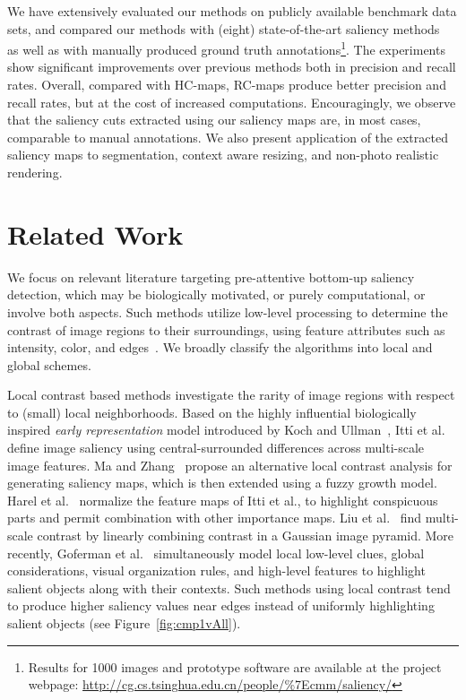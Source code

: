 \documentclass[10pt,twocolumn,letterpaper]{article}
\newcommand{\figref}[1]{Figure~\ref{#1}}
\newcommand{\RC}{RC-maps }
\begin{document}
We have extensively evaluated our methods on publicly available benchmark data sets, and compared
our methods with (eight) state-of-the-art saliency methods
~\cite{98pami/Itti,03ACMMM/Ma_Contrast-based,06acmmm/ZhaiS_spatiotemporal,conf/nips/HarelKP06,07cvpr/hou_SpectralResidual,08cvs/achanta_salient,09cvpr/Achanta_FTSaliency,10cvpr/goferman_context}
as well as with manually produced ground truth annotations\footnote{Results for 1000 images and
prototype software are available at the project webpage:
\href{http://cg.cs.tsinghua.edu.cn/people/~cmm/saliency/}{http://cg.cs.tsinghua.edu.cn/people/\%7Ecmm/saliency/}}.
%
The experiments show significant improvements over previous methods both in precision and recall rates.
%
Overall, compared with HC-maps, \RC produce better precision and recall rates, but at the cost
of increased computations. Encouragingly, we observe that the saliency cuts extracted
using our saliency maps are, in most cases, comparable to manual annotations.
%
We also present application of the extracted saliency maps to segmentation,
context aware resizing, and non-photo realistic rendering.




\section{Related Work}
\label{sec:RelatedWorks}

We focus on relevant literature targeting pre-attentive bottom-up saliency detection,
which may be biologically motivated, or purely computational, or involve both aspects.
%
Such methods utilize low-level processing to determine the contrast of image regions to their surroundings,
using feature attributes such as intensity, color, and edges~\cite{09cvpr/Achanta_FTSaliency}.
%
We broadly classify the algorithms into local and global schemes.


Local contrast based methods investigate the rarity of image regions with respect to (small) local neighborhoods.
%
Based on the highly influential biologically inspired \emph{early representation} model introduced
by Koch and Ullman~\cite{85HN/KochVisualAttention}, Itti et al.~\cite{98pami/Itti} define image
saliency using central-surrounded differences across multi-scale image features.
%
Ma and Zhang~\cite{03ACMMM/Ma_Contrast-based} propose an alternative local contrast
analysis for generating saliency maps, which is then extended using a fuzzy growth model.
%
Harel et al.~\cite{conf/nips/HarelKP06} normalize the feature maps of Itti et al., to highlight
conspicuous parts and permit combination with other importance maps.
%
Liu et al.~\cite{10pami/Liu_Learning} find multi-scale contrast by linearly combining contrast
in a Gaussian image pyramid.
%
More recently, Goferman et al.~\cite{10cvpr/goferman_context} simultaneously model local
low-level clues, global considerations, visual organization rules, and high-level
features to highlight salient objects along with their contexts.
%
Such methods using local contrast tend to produce higher saliency values near edges instead of uniformly
highlighting salient objects (see \figref{fig:cmp1vAll}).
\end{document}
